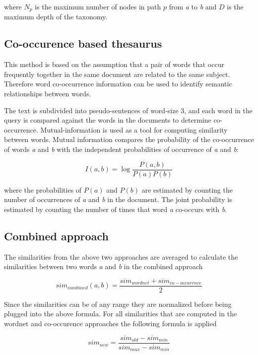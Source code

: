 \documentclass[a4paper, 12pt, notitlepage]{report}
\begin{document}
where $N_p$ is the maximum number of nodes in path $p$ from \textit{a} to \textit{b} and $D$ is the maximum depth of the taxonomy.

\subsection*{Co-occurence based thesaurus}
This method is based on the assumption that a pair of words that occur frequently together in the same document are related to the same subject. Therefore word co-occurrence information can be used to identify semantic relationships between words.\cite{paper}

The text is subdivided into pseudo-sentences of word-size 3, and each word in the query is compared against the words in the documents to determine co-occurrence. Mutual-information is used as a tool for computing similarity between words. Mutual information compares the probability of the co-occurrence of words \textit{a} and \textit{b} with the independent probabilities of occurrence of \textit{a} and \textit{b}:

\begin{equation*}
I(a,b) = \log\frac{P(a,b)}{P(a)P(b)}
\end{equation*}

where the probabilities of $P(a)$ and $P(b)$ are estimated by counting the number of occurrences of \textit{a} and \textit{b} in the document. The joint probability is estimated by counting the number of times that word \textit{a} co-occurs with \textit{b}.

\subsection*{Combined approach}
The similarities from the above two approaches are averaged to calculate the similarities between two words \textit{a} and \textit{b} in the combined approach

\begin{equation*}
sim_{combined} (a,b) = \frac{sim_{wordnet} + sim_{co-occurence}}{2}
\end{equation*}

Since the similarities can be of any range they are normalized before being plugged into the above formula. For all similarities that are computed in the wordnet and co-occurence approaches the following formula is applied

\begin{equation*}
sim_{new} = \frac{sim_{old} - sim_{min}}{sim_{max} - sim_{min}}
\end{equation*}
\end{document}
